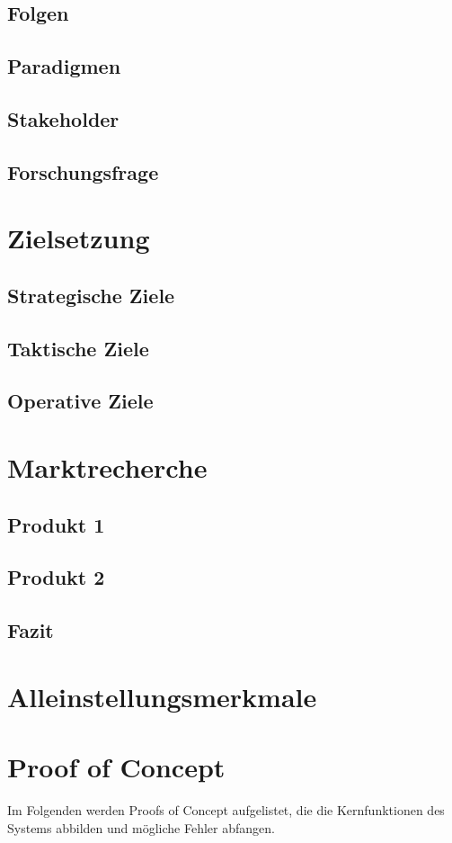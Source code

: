 \documentclass[12pt,titlepage]{scrartcl}
\begin{document}
		\subsection{Folgen}
		\subsection{Paradigmen}
		\subsection{Stakeholder}
		\subsection{Forschungsfrage}
	\newpage	
	\section{Zielsetzung}
		\subsection{Strategische Ziele}
		\subsection{Taktische Ziele}
		\subsection{Operative Ziele}
	\newpage	
	\section{Marktrecherche}
		\subsection{Produkt 1}
		\subsection{Produkt 2}
		\subsection{Fazit}
	\newpage
	\section{Alleinstellungsmerkmale}	
	
	\section{Proof of Concept}
Im Folgenden werden Proofs of Concept aufgelistet, die die Kernfunktionen des Systems abbilden und mögliche Fehler abfangen.
\end{document}
